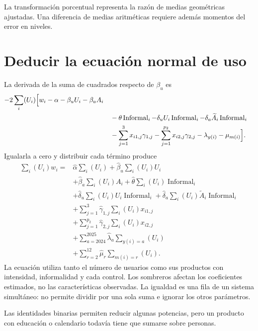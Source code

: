 \documentclass[11pt,a4paper]{article}
\begin{document}
La transformación porcentual representa la razón de medias geométricas ajustadas. Una diferencia de medias aritméticas requiere además momentos del error en niveles.

\clearpage
\section{Deducir la ecuación normal de uso}
La derivada de la suma de cuadrados respecto de $\beta_u$ es
\[
\begin{aligned}-2\sum_i(U_i)\Bigl[w_i-\alpha-\beta_uU_i-\beta_aA_i\\&\quad-\theta\operatorname{Informal}_i-\delta_uU_i\operatorname{Informal}_i-\delta_a\widetilde A_i\operatorname{Informal}_i\\&\quad-\sum_{j=1}^3x_{i1,j}\gamma_{1,j}-\sum_{j=1}^{p_2}x_{i2,j}\gamma_{2,j}-\lambda_{y(i)}-\mu_{m(i)}\Bigr].\end{aligned}
\]
Igualarla a cero y distribuir cada término produce
\[
\begin{aligned}
\sum_i(U_i)w_i={}&\widehat\alpha\sum_i(U_i)
+\widehat\beta_u\sum_i(U_i)U_i\\
&+\widehat\beta_a\sum_i(U_i)A_i
+\widehat\theta\sum_i(U_i)\operatorname{Informal}_i\\
&+\widehat\delta_u\sum_i(U_i)U_i\operatorname{Informal}_i
+\widehat\delta_a\sum_i(U_i)\widetilde A_i\operatorname{Informal}_i\\
&+\sum_{j=1}^3\widehat\gamma_{1,j}\sum_i(U_i)x_{i1,j}\\
&+\sum_{j=1}^{p_2}\widehat\gamma_{2,j}\sum_i(U_i)x_{i2,j}\\
&+\sum_{a=2024}^{2025}\widehat\lambda_a\sum_{y(i)=a}(U_i)\\
&+\sum_{r=2}^{12}\widehat\mu_r\sum_{m(i)=r}(U_i).\end{aligned}
\]
La ecuación utiliza tanto el número de usuarios como sus productos con intensidad, informalidad y cada control.
Los sombreros afectan los coeficientes estimados, no las características observadas. La igualdad es una fila de un sistema simultáneo: no permite dividir por una sola suma e ignorar los otros parámetros.

Las identidades binarias permiten reducir algunas potencias, pero un producto con educación o calendario todavía tiene que sumarse sobre personas.

\clearpage
\end{document}

